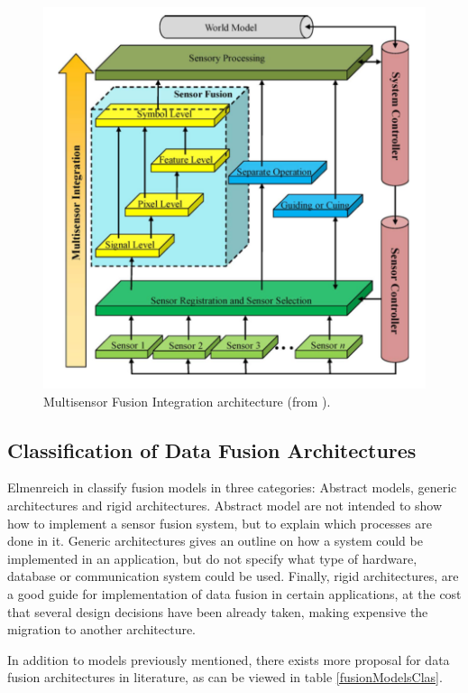 \begin{figure}[ht!]
\centering
\includegraphics[scale=0.4]{fig/2/MFIArch.png}
\caption{Multisensor Fusion Integration architecture (from \cite{Luo2011}).}
\label{MFIArch}
\end{figure}

\subsection{Classification of Data Fusion Architectures}

Elmenreich in \cite{Elmenreich2007} classify fusion models in three categories: Abstract models, generic architectures and rigid architectures. Abstract model are not intended to show how to implement a sensor fusion system, but to explain which processes are done in it. Generic architectures gives an outline on how a system could be implemented in an application, but do not specify what type of hardware, database or communication system could be used. Finally, rigid architectures, are a good guide for implementation  of data fusion in certain applications, at the cost that several design decisions have been already taken, making expensive the migration to another architecture. 

In addition to models previously mentioned, there exists more proposal for data fusion architectures in literature, as can be viewed in table \ref{fusionModelsClas}.



